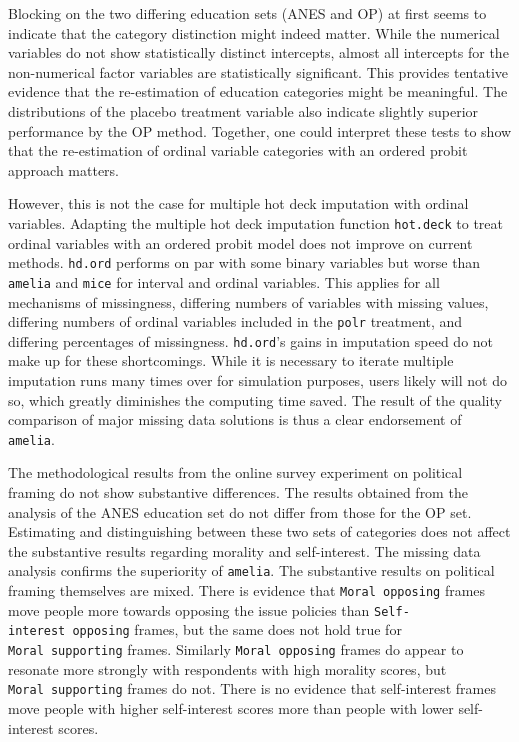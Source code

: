 \documentclass[12pt,econ]{sources/authesis}
\begin{document}
Blocking on the two differing education sets (ANES and OP) at first seems to indicate that the category distinction might indeed matter. While the numerical variables do not show statistically distinct intercepts, almost all intercepts for the non-numerical factor variables are statistically significant. This provides tentative evidence that the re-estimation of education categories might be meaningful. The distributions of the placebo treatment variable also indicate slightly superior performance by the OP method. Together, one could interpret these tests to show that the re-estimation of ordinal variable categories with an ordered probit approach matters.

However, this is not the case for multiple hot deck imputation with ordinal variables. Adapting the multiple hot deck imputation function \texttt{hot.deck} to treat ordinal variables with an ordered probit model does not improve on current methods. \texttt{hd.ord} performs on par with some binary variables but worse than \texttt{amelia} and \texttt{mice} for interval and ordinal variables. This applies for all mechanisms of missingness, differing numbers of variables with missing values, differing numbers of ordinal variables included in the \texttt{polr} treatment, and differing percentages of missingness. \texttt{hd.ord}'s gains in imputation speed do not make up for these shortcomings. While it is necessary to iterate multiple imputation runs many times over for simulation purposes, users likely will not do so, which greatly diminishes the computing time saved. The result of the quality comparison of major missing data solutions is thus a clear endorsement of \texttt{amelia}.

The methodological results from the online survey experiment on political framing do not show substantive differences. The results obtained from the analysis of the ANES education set do not differ from those for the OP set. Estimating and distinguishing between these two sets of categories does not affect the substantive results regarding morality and self-interest. The missing data analysis confirms the superiority of \texttt{amelia}. The substantive results on political framing themselves are mixed. There is evidence that \texttt{Moral\ opposing} frames move people more towards opposing the issue policies than \texttt{Self-interest\ opposing} frames, but the same does not hold true for \texttt{Moral\ supporting} frames. Similarly \texttt{Moral\ opposing} frames do appear to resonate more strongly with respondents with high morality scores, but \texttt{Moral\ supporting} frames do not. There is no evidence that self-interest frames move people with higher self-interest scores more than people with lower self-interest scores.
\end{document}
